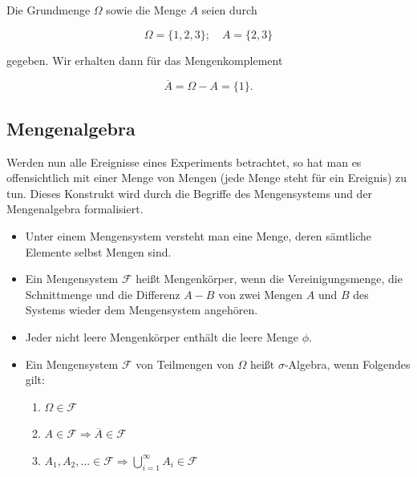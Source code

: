 
\begin{beispiel}[Mengenkomplement]
Die Grundmenge $\Omega$ sowie die Menge $A$ seien durch

$$
\Omega = \{1,2,3\}; \quad A = \{2,3\}
$$

gegeben. Wir erhalten dann für das Mengenkomplement

$$
\overline{A} = \Omega - A = \{1\}.
$$
\end{beispiel}

\subsection{Mengenalgebra}
\label{sec:mengenalgebra}

Werden nun alle Ereignisse eines Experiments betrachtet, so hat man es offensichtlich mit einer Menge von Mengen (jede Menge steht für ein Ereignis) zu tun. Dieses Konstrukt wird durch die Begriffe des Mengensystems und der Mengenalgebra formalisiert.

\begin{definition}
\begin{itemize}
  \item Unter einem Mengensystem versteht man eine Menge, deren sämtliche Elemente selbst Mengen sind.
  \item Ein Mengensystem $\mathcal{F}$ heißt Mengenkörper, wenn die Vereinigungsmenge, die Schnittmenge und die Differenz $A - B$ von zwei Mengen $A$ und $B$ des Systems wieder dem Mengensystem angehören.
  \item Jeder nicht leere Mengenkörper enthält die leere Menge $\phi$.
  \item Ein Mengensystem $\mathcal{F}$ von Teilmengen von $\Omega$ heißt $\sigma$-Algebra, wenn Folgendes gilt:
    \begin{enumerate}
      \item $\Omega \in \mathcal{F}$
      \item $A \in \mathcal{F} \Rightarrow \overline{A} \in \mathcal{F}$
      \item $A_1, A_2, \ldots \in \mathcal{F} \Rightarrow \bigcup_{i=1}^{\infty} A_i \in \mathcal{F}$
    \end{enumerate}
\end{itemize}
\end{definition}

